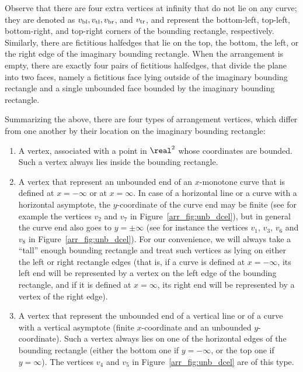\begin{ccAdvanced}
Observe that there are four extra vertices at infinity that do not lie
on any curve; they are denoted as $v_{\rm bl}, v_{\rm tl}, 
v_{\rm br}$, and $v_{\rm tr}$, and represent the bottom-left, top-left,
bottom-right, and top-right corners of the bounding rectangle,
respectively. Similarly, there are fictitious halfedges that lie on
the top, the bottom, the left, or the right edge of the imaginary
bounding rectangle. When the arrangement is empty, there are exactly
four pairs of fictitious halfedges, that divide the plane into two
faces, namely a fictitious face lying outside of the imaginary bounding
rectangle and a single unbounded face bounded by the imaginary
bounding rectangle. 

Summarizing the above, there are four types of arrangement vertices,
which differ from one another by their location on the imaginary
bounding rectangle:
\begin{enumerate}
\item\label{type-normal}
  A vertex, associated with a point in $\real^2$ whose
  coordinates are bounded. Such a vertex always lies inside the
  bounding rectangle.
\item\label{type-unbounded}
  A vertex that represent an unbounded end of an $x$-monotone curve
  that is defined at $x = -\infty$ or at $x = \infty$. In case of
  a horizontal line or a curve with a horizontal asymptote, the
  $y$-coordinate of the curve end may be finite (see for example the
  vertices $v_2$ and $v_7$ in Figure~\ref{arr_fig:unb_dcel}), but in
  general the curve end also goes to $y = \pm\infty$ (see for instance
  the vertices $v_1$, $v_3$, $v_6$ and $v_8$ in
  Figure~\ref{arr_fig:unb_dcel}). For our convenience, we will always
  take a ``tall'' enough bounding rectangle and treat such vertices as
  lying on either the left or right rectangle edges (that is, if a curve
  is defined at $x = -\infty$, its left end will be represented by
  a vertex on the left edge of the bounding rectangle, and if it is
  defined at $x = \infty$, its right end will be represented by a
  vertex of the right edge).
\item\label{type-unbounded-vertical}
  A vertex that represent the unbounded end of a vertical line or of a
  curve with a vertical asymptote (finite $x$-coordinate and an
  unbounded $y$-coordinate). Such a vertex always lies on one of the
  horizontal edges of the bounding rectangle (either the bottom one if
  $y = -\infty$, or the top one if $y = \infty$). The vertices $v_4$ 
  and $v_5$ in Figure~\ref{arr_fig:unb_dcel} are of this type.

\end{enumerate}
\end{ccAdvanced}
